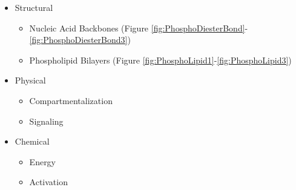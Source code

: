 \documentclass[]{article}
\begin{document}
\begin{itemize}
	\item Structural
	\begin{itemize}
		\item Nucleic Acid Backbones (Figure \ref{fig:PhosphoDiesterBond}-\ref{fig:PhosphoDiesterBond3})
		\item Phospholipid Bilayers (Figure \ref{fig:PhosphoLipid1}-\ref{fig:PhosphoLipid3})
	\end{itemize}

	\item Physical\begin{itemize}
		\item Compartmentalization
		\item Signaling
	\end{itemize}
	\item Chemical
	\begin{itemize}
		\item Energy
		\item Activation
	\end{itemize}
\end{itemize}
\end{document}
